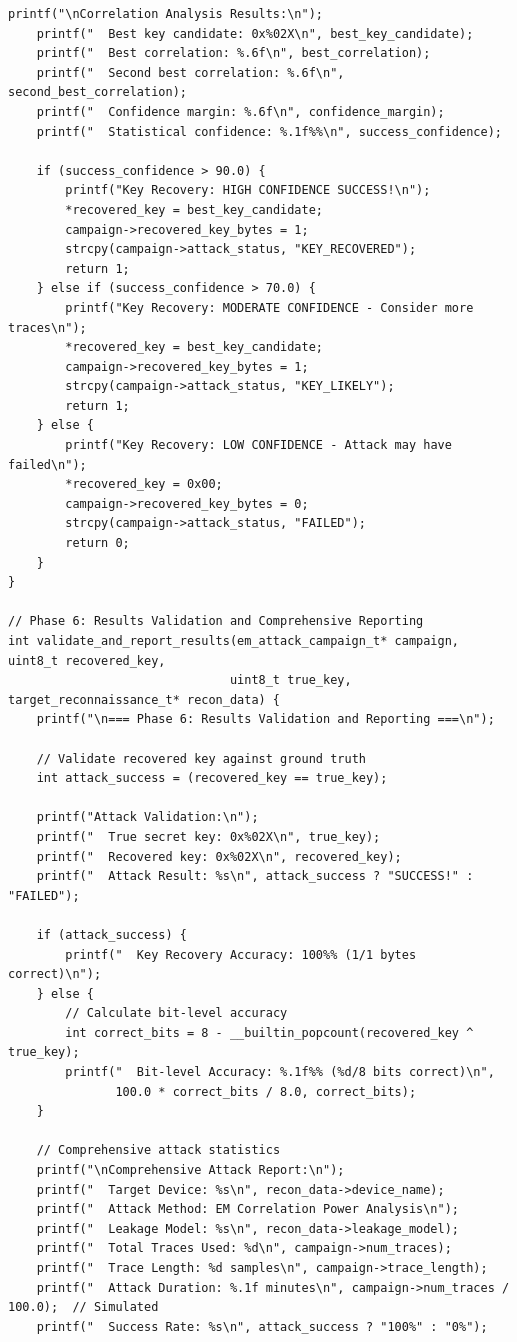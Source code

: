\documentclass[11pt,a4paper]{article}
\theoremstyle{definition}
\begin{document}
\begin{lstlisting}[caption={Complete EM Attack Methodology Framework Implementation}]
    printf("\nCorrelation Analysis Results:\n");
    printf("  Best key candidate: 0x%02X\n", best_key_candidate);
    printf("  Best correlation: %.6f\n", best_correlation);
    printf("  Second best correlation: %.6f\n", second_best_correlation);
    printf("  Confidence margin: %.6f\n", confidence_margin);
    printf("  Statistical confidence: %.1f%%\n", success_confidence);
    
    if (success_confidence > 90.0) {
        printf("Key Recovery: HIGH CONFIDENCE SUCCESS!\n");
        *recovered_key = best_key_candidate;
        campaign->recovered_key_bytes = 1;
        strcpy(campaign->attack_status, "KEY_RECOVERED");
        return 1;
    } else if (success_confidence > 70.0) {
        printf("Key Recovery: MODERATE CONFIDENCE - Consider more traces\n");
        *recovered_key = best_key_candidate;
        campaign->recovered_key_bytes = 1;
        strcpy(campaign->attack_status, "KEY_LIKELY");
        return 1;
    } else {
        printf("Key Recovery: LOW CONFIDENCE - Attack may have failed\n");
        *recovered_key = 0x00;
        campaign->recovered_key_bytes = 0;
        strcpy(campaign->attack_status, "FAILED");
        return 0;
    }
}

// Phase 6: Results Validation and Comprehensive Reporting
int validate_and_report_results(em_attack_campaign_t* campaign, uint8_t recovered_key,
                               uint8_t true_key, target_reconnaissance_t* recon_data) {
    printf("\n=== Phase 6: Results Validation and Reporting ===\n");
    
    // Validate recovered key against ground truth
    int attack_success = (recovered_key == true_key);
    
    printf("Attack Validation:\n");
    printf("  True secret key: 0x%02X\n", true_key);
    printf("  Recovered key: 0x%02X\n", recovered_key);
    printf("  Attack Result: %s\n", attack_success ? "SUCCESS!" : "FAILED");
    
    if (attack_success) {
        printf("  Key Recovery Accuracy: 100%% (1/1 bytes correct)\n");
    } else {
        // Calculate bit-level accuracy
        int correct_bits = 8 - __builtin_popcount(recovered_key ^ true_key);
        printf("  Bit-level Accuracy: %.1f%% (%d/8 bits correct)\n", 
               100.0 * correct_bits / 8.0, correct_bits);
    }
    
    // Comprehensive attack statistics
    printf("\nComprehensive Attack Report:\n");
    printf("  Target Device: %s\n", recon_data->device_name);
    printf("  Attack Method: EM Correlation Power Analysis\n");
    printf("  Leakage Model: %s\n", recon_data->leakage_model);
    printf("  Total Traces Used: %d\n", campaign->num_traces);
    printf("  Trace Length: %d samples\n", campaign->trace_length);
    printf("  Attack Duration: %.1f minutes\n", campaign->num_traces / 100.0);  // Simulated
    printf("  Success Rate: %s\n", attack_success ? "100%" : "0%");
    

\end{lstlisting}
\end{document}
